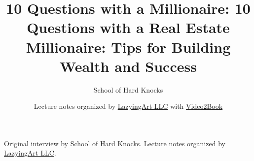 \documentclass[11pt,oneside]{book}
\begin{document}
\frontmatter
\title{10 Questions with a Millionaire: 10 Questions with a Real Estate Millionaire: Tips for Building Wealth and Success}
\author{School of Hard Knocks}
\date{Lecture notes organized by \href{https://lazying.art}{LazyingArt LLC} with \href{https://github.com/lachlanchen/Video2Book}{Video2Book}}
\maketitle
\begin{center}
\small Original interview by School of Hard Knocks. Lecture notes organized by \href{https://lazying.art}{LazyingArt LLC}.
\end{center}
\clearpage
\mainmatter

\end{document}
